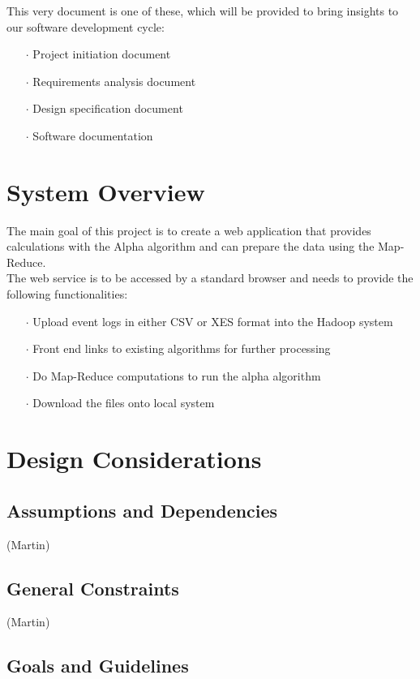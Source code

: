 \documentclass[runningheads]{llncs}
\begin{document}
\noindent
This very document is one of these, which will be provided to bring insights to our software development cycle:

\begin{itemize}
	\item[\Large $\cdot$]  Project initiation document
	\item[\Large $\cdot$]  Requirements analysis document
	\item[\Large $\cdot$]  Design specification document
	\item[\Large $\cdot$]  Software documentation
\end{itemize}

\section{System Overview}
The main goal of this project is to create a web application that provides calculations with the Alpha algorithm and can prepare the data using the Map-Reduce. \\

\noindent
The web service is to be accessed by a standard browser and needs to provide the following functionalities:
\begin{itemize}
	\item[\Large $\cdot$] Upload event logs in either CSV or XES format into the Hadoop system
	\item[\Large $\cdot$] Front end links to existing algorithms for further processing
	\item[\Large $\cdot$] Do Map-Reduce computations to run the alpha algorithm
	\item[\Large $\cdot$] Download the files onto local system
\end{itemize}

\section{Design Considerations}
\subsection{Assumptions and Dependencies}
(Martin)
\subsection{General Constraints}
(Martin)
\subsection{Goals and Guidelines}
\end{document}
